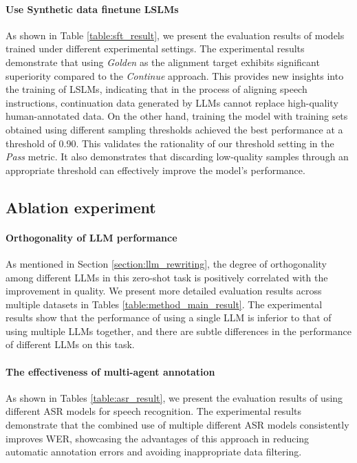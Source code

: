\documentclass[11pt]{article}
\begin{document}
	\paragraph{Use Synthetic data finetune LSLMs}

	As shown in Table \ref{table:sft_result}, we present the evaluation results of models trained under different experimental settings. The experimental results demonstrate that using \textit{Golden} as the alignment target exhibits significant superiority compared to the \textit{Continue} approach. This provides new insights into the training of LSLMs, indicating that in the process of aligning speech instructions, continuation data generated by LLMs cannot replace high-quality human-annotated data. On the other hand, training the model with training sets obtained using different sampling thresholds achieved the best performance at a threshold of 0.90. This validates the rationality of our threshold setting in the \textit{Pass} metric. It also demonstrates that discarding low-quality samples through an appropriate threshold can effectively improve the model’s performance.
	

	
	\subsection{Ablation experiment}
	

	
	\paragraph{Orthogonality of LLM performance}

	As mentioned in Section \ref{section:llm_rewriting}, the degree of orthogonality among different LLMs in this zero-shot task is positively correlated with the improvement in quality. 
	We present more detailed evaluation results across multiple datasets in Tables \ref{table:method_main_result}.
	The experimental results show that the performance of using a single LLM is inferior to that of using multiple LLMs together, and there are subtle differences in the performance of different LLMs on this task.
	

	



	\paragraph{The effectiveness of multi-agent annotation}	
	As shown in Tables \ref{table:asr_result}, we present the evaluation results of using different ASR models for speech recognition. The experimental results demonstrate that the combined use of multiple different ASR models consistently improves WER, showcasing the advantages of this approach in reducing automatic annotation errors and avoiding inappropriate data filtering. 
	
\end{document}
